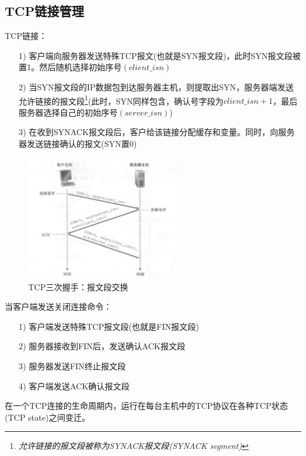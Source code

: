 \subsection{TCP链接管理}

    TCP链接：

\begin{itemize}
    \item [1)] 客户端向服务器发送特殊TCP报文(也就是SYN报文段)，此时SYN报文段被置1。然后随机选择初始序号$(client\_isn)$
    \item [2)] 当SYN报文段的IP数据包到达服务器主机，则提取出SYN，服务器端发送允许链接的报文段\footnote[1]{\emph{允许链接的报文段被称为SYNACK报文段(SYNACK segment)}}(此时，SYN同样包含，确认号字段为$client\_isn + 1$，最后服务器选择自己的初始序号$(server\_isn)$)
    \item [3)] 在收到SYNACK报文段后，客户给该链接分配缓存和变量。同时，向服务器发送链接确认的报文(SYN置0)
\end{itemize}

\begin{figure}[!htbp]
    \centering
    \includegraphics[width=0.6\textwidth]{image/chapter03/TCP三次握手，报文段交换.png}
    \caption{TCP三次握手：报文段交换}
\end{figure}

    当客户端发送关闭连接命令：

\begin{itemize}
    \item [1)] 客户端发送特殊TCP报文段(也就是FIN报文段)
    \item [2)] 服务器接收到FIN后，发送确认ACK报文段
    \item [3)] 服务器发送FIN终止报文段
    \item [4)] 客户端发送ACK确认报文段
\end{itemize}

    在一个TCP连接的生命周期内，运行在每台主机中的TCP协议在各种TCP状态(TCP state)之间变迁。

